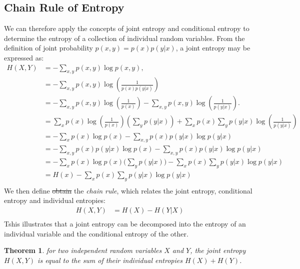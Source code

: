 \documentclass[12pt]{article}
\newtheorem{theorem}{Theorem}
\begin{document}
		\subsection{Chain Rule of Entropy}
		We can therefore apply the concepts of joint entropy and conditional entropy to determine the entropy of a collection of individual random variables. %
		From the definition of joint probability \( p(x, y) = p(x) p(y|x) \), a joint entropy may be expressed as:
		\begin{align}
			H(X, Y) & = -\sum_{x, y} p(x, y) \log p(x, y), \\
			&= -\sum_{x, y} p(x, y) \log \left(\frac{1}{p(x)p(y|x)}\right) \\
			&= -\sum_{x, y} p(x, y) \log \left(\frac{1}{p(x)}\right) - \sum_{x, y} p(x, y) \log \left(\frac{1}{p(y|x)}\right).\\
			&= \sum_{x} p(x) \log \left(\frac{1}{p(x)}\right) \left(\sum_{y} p(y|x)\right) + \sum_{x} p(x) \sum_{y} p(y|x) \log \left(\frac{1}{p(y|x)}\right) \\
			& = -\sum_{x} p(x) \log p(x) - \sum_{x,y} p(x) p(y|x) \log p(y|x) \\
			& = -\sum_{x,y} p(x) p(y|x) \log p(x) - \sum_{x,y} p(x) p(y|x) \log p(y|x) \\
			& = -\sum_{x} p(x)  \log p(x) \Biggr( \sum_{y}  p(y|x)  \Biggr) - \sum_{x} p(x)  \sum_{y}  p(y|x)   \log p(y|x) \\
			& =H(x) - \sum_{x} p(x)  \sum_{y}  p(y|x)   \log p(y|x) \\
		\end{align}
		We then define \st{obtain} the \emph{chain rule}, which relates the joint entropy, conditional entropy and individual entropies:
		\begin{equation}
			\begin{split}
				H(X, Y) 
				& =  H(X) - H(Y|X) \\
			\end{split}
		\end{equation}
		Tshis illustrates that a joint entropy can be decomposed into the entropy of an individual variable and the conditional entropy of the other.
		\begin{theorem}
			for two independent random variables \(X\) and \(Y\), the joint entropy \(H(X, Y)\) is equal to the sum of their individual entropies \(H(X) + H(Y)\).
		\end{theorem}
\end{document}
